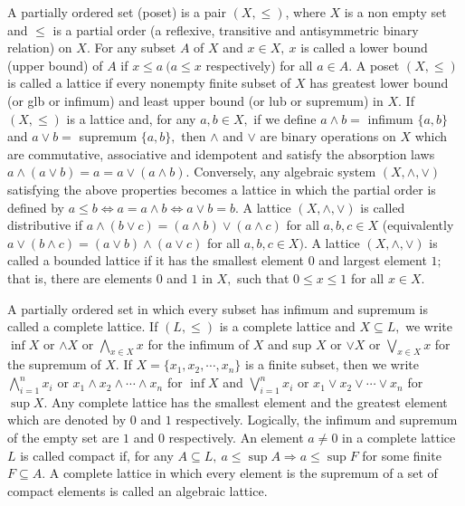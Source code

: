 \documentclass[
11pt,%
tightenlines,%
twoside,%
onecolumn,%
nofloats,%
nobibnotes,%
nofootinbib,%
superscriptaddress,%
noshowpacs,%
centertags]%
{revtex4}
\begin{document}
A partially ordered set (poset) is a pair $(X, \leq)$,  where $X$ is
a non empty set and $\leq$ is a partial order (a reflexive,
transitive and antisymmetric binary relation) on $X.$ For any subset
$A$ of $X$ and $x \in X, ~ x$ is called a lower bound (upper bound)
of $A$ if $x \leq a~ ( a \leq x $ respectively) for all $a \in A. $
A poset $(X, \leq )$ is called  a lattice if every nonempty finite
subset of $X$ has greatest lower bound (or glb or infimum) and least
upper bound (or lub or supremum) in $X.$ If $( X, \leq ) $ is a
lattice and, for any $a, b \in X,$ if we define $a \wedge b =$
infimum $ \{ a, b \}$ and $ a \vee b =$ supremum $\{a, b \},$ then
$\wedge$ and $\vee$ are binary operations on $X$ which are
commutative, associative and idempotent and satisfy the absorption
laws $ a \wedge ( a \vee b ) = a =  a \vee ( a \wedge b ). $
Conversely, any algebraic system $ ( X, \wedge , \vee )$ satisfying
the above properties becomes a lattice in which the partial order is
defined by $a \leq b \Longleftrightarrow a = a \wedge b
\Longleftrightarrow a \vee b = b.$ A lattice $( X, \wedge, \vee)$ is
called distributive if $a \wedge (b \vee c) = (a \wedge b) \vee (a
\wedge c)$ for all $a, b, c \in X$ (equivalently $a \vee ( b \wedge
c) = ( a \vee b ) \wedge ( a \vee c)$ for all $a,b,c \in X).$ A
lattice  $(X, \wedge, \vee)$ is called a bounded lattice if it has
the smallest element $0$ and largest element  $1;$ that is, there
are elements $0$ and $1$ in $X,$ such that $0 \leq x \leq 1$ for all
$x \in X.$


A partially ordered set in which every subset has  infimum and
supremum is called a complete lattice. If $(L, \leq)$ is a complete
lattice
 and $X \subseteq L,$ we write $\inf X$ or $\wedge X$
 or $\bigwedge  \limits_{x \in X} x$ for the infimum of $X$  and sup $X$ or $\vee X$ or
  $\bigvee \limits_{x \in X} x$ for the supremum
  of $X.$ If $ X =  \{ x_1, x_2, \cdots , x_n \}$ is a finite subset,
   then we write $\bigwedge \limits_{i = 1} ^{n}  x_i$ or $x_1 \wedge x_2 \wedge  \cdots \wedge x_n$
   for $\inf X$ and $\bigvee \limits _{i = 1} ^{n} x_i$
   or $x_1 \vee x_2 \vee \cdots \vee x_n$ for $\sup X.$ Any complete lattice has the smallest element
    and the greatest element which are denoted by $0$ and $1$ respectively. Logically, the infimum
    and supremum of the empty set are $1$ and $0$ respectively.
    An element $a \neq 0$ in a complete lattice $L$ is called compact if, for any
    $A \subseteq L,~ a \leq \sup A \Longrightarrow a \leq \sup F$ for some finite $F \subseteq A.$
    A complete lattice in which every element is the supremum of a set of compact elements is called
    an algebraic lattice.
\end{document}
